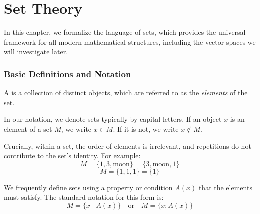 \renewcommand{\thetheorem}{3.\arabic{theorem}}
\setcounter{theorem}{0}
\setcounter{chapter}{2}
%

\chapter{Set Theory}

In this chapter, we formalize the language of sets, which provides the universal framework for all modern mathematical structures, including the vector spaces we will investigate later.

\subsection{Basic Definitions and Notation}

\begin{definition}[Set]
\label{def:set}
A  is a collection of distinct objects, which are referred to as the \textit{elements} of the set.
\end{definition}

In our notation, we denote sets typically by capital letters. If an object $x$ is an element of a set $M$, we write $x \in M$. If it is not, we write $x \notin M$.

\begin{remark}
Crucially, within a set, the order of elements is irrelevant, and repetitions do not contribute to the set's identity. For example:
\[
M = \{1, 3, \text{moon}\} = \{3, \text{moon}, 1\}
\]
\[
M = \{1, 1, 1\} = \{1\}
\]
\end{remark}

We frequently define sets using a property or condition $A(x)$ that the elements must satisfy. The standard notation for this  form is:
\[
M = \{x \mid A(x)\} \quad \text{or} \quad M = \{x : A(x)\}
\]

